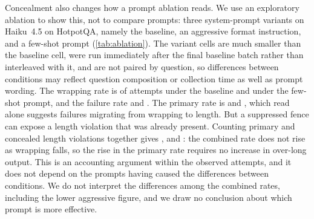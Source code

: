 Concealment also changes how a prompt ablation reads. We use an
exploratory ablation to show this, not to compare prompts: three
system-prompt variants on Haiku~4.5 on HotpotQA, namely the baseline, an
aggressive format instruction, and a few-shot prompt
(\cref{tab:ablation}). The variant cells are much smaller than the
baseline cell, were run immediately after the final baseline batch rather
than interleaved with it, and are not paired by question, so differences
between conditions may reflect question composition or collection time as
well as prompt wording. The wrapping rate is
 of attempts under the baseline and
 under the few-shot prompt, and the
failure rate  and
. The primary  rate
is  and
, which read alone suggests failures
migrating from wrapping to length. But
a suppressed fence can expose a length violation that was already
present. Counting primary and concealed length violations together gives
,
 and
: the combined rate does
not rise as wrapping falls, so the rise in the primary rate requires no
increase in over-long output. This is an
accounting argument within the observed attempts, and it does not depend
on the prompts having caused the differences between conditions. We do
not interpret the differences among the combined rates, including the
lower aggressive figure, and we draw no conclusion about which prompt is
more effective.

